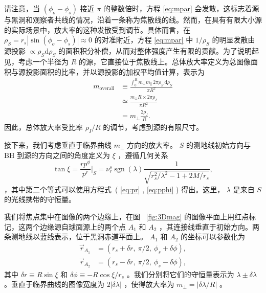 \documentclass[aps,reprint,superscriptaddress,nofootinbib,floatfix,longbibliography,preprintnumbers]{revtex4-1}
\newcommand{\dd}{\mathrm{d}}
\begin{document}
请注意，当    $\left(\phi_o - \phi_s\right)$    接近    $\pi$    的整数倍时，方程    \ref{eq:mpar}    会发散，这标志着源与黑洞和观察者共线的情况，沿着一条称为焦散线的线。然而，在具有有限大小源的实际场景中，放大率的这种发散受到调节。具体而言，在    $\rho_S = r_s |\sin(\phi_o - \phi_s)| \approx 0$    的对准附近，方程    \ref{eq:mpar}    中    $1/\rho_S$    的明显发散由源投影    $\propto \rho_S \dd \rho_S$    的面积积分补偿，从而对整体强度产生有限的贡献。为了说明起见，考虑一个半径为    $R$    的源，它直接位于焦散线上。总体放大率定义为总图像面积与源投影面积的比率，并以源投影的加权平均值计算，表示为
   \begin{equation}
\begin{aligned}
m_{\text{overall}} &\equiv \frac{\int_0^R m_{\perp} m_{\parallel} \, 2\pi\rho_S \, \dd\rho_S}{\pi R^2}  \\ 
&\simeq \frac{m_{\perp}R \times 2\pi\rho_I}{\pi R^2}  \\  
&= m_{\perp} \frac{2\rho_I}{R}.
\end{aligned}
\end{equation}    因此，总体放大率受比率    $\rho_I/R$    的调节，考虑到源的有限尺寸。  

接下来，我们考虑垂直于临界曲线    $m_{\perp}$    方向的放大率。   $S$    的测地线初始方向与 BH 到源的方向之间的角度定义为    $\xi$    ，遵循几何关系    \begin{equation}
    \tan\xi=\frac{r p^{\phi}}{p^{r}}\bigg\rvert_{S}=\nu_r^s\operatorname{sgn}(\lambda)\frac{1}{\sqrt{r_s^2/\lambda^2-1+2M/r_s}},
    \label{eq:xi}
\end{equation}    ，其中第二个等式可以使用方程式~(    \ref{eq:pr}    ,    \ref{eq:pphi}    ) 得出。这里，   $\lambda$    是来自    $S$    的光线携带的守恒量。  

我们将焦点集中在图像的两个边缘上，在图~    \ref{fig:3Dmag}    的图像平面上用红点标记，这两个边缘源自球面源上的两个点    $A_1$    和    $A_2$    ，其连接线垂直于初始方向。两条测地线以蓝线表示，位于黑洞赤道平面上。    $A_1$    和    $A_2$    的坐标可以参数化为
   \begin{equation}
\begin{aligned}
        \vec{r}_{A_1} &= (r_s+\delta r, \  \pi/2, \  \phi_s+\delta\phi), \\ 
        \vec{r}_{A_2} &= (r_s-\delta r, \  \pi/2, \  \phi_s-\delta\phi),
\end{aligned}
\label{eq:rA1A2}
\end{equation}    其中    $\delta r \equiv R \sin \xi$    和    $\delta \phi \equiv -R \cos \xi / r_s$    。我们分别将它们的守恒量表示为    $\lambda \pm \delta \lambda$    。垂直于临界曲线的图像宽度为    $2|\delta\lambda|$    ，使得放大率为    $m_\perp = |\delta\lambda / R|$    。  
\end{document}
